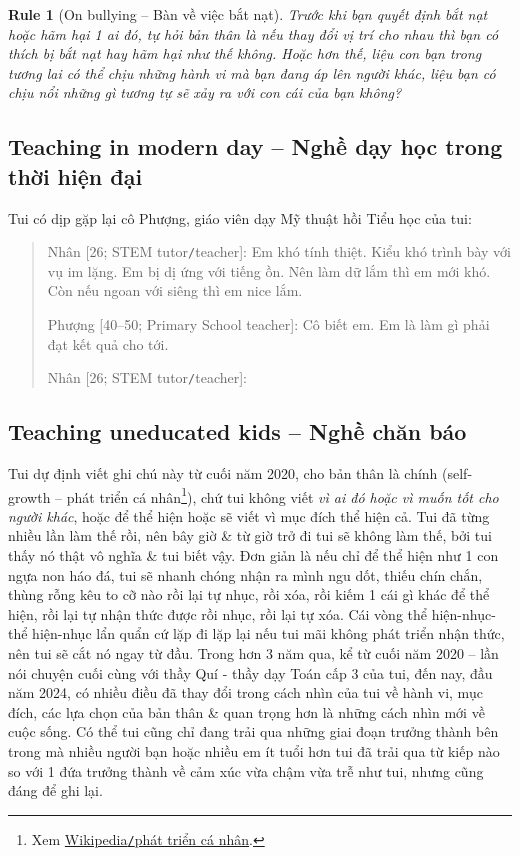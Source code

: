 \documentclass[12pt,oneside]{book}
\newtheorem{Rule}{Rule}
\begin{document}
\begin{Rule}[On bullying -- Bàn về việc bắt nạt]
	Trước khi bạn quyết định bắt nạt hoặc hãm hại 1 ai đó, tự hỏi bản thân là nếu thay đổi vị trí cho nhau thì bạn có thích bị bắt nạt hay hãm hại như thế không. Hoặc hơn thế, liệu con bạn trong tương lai có thể chịu những hành vi mà bạn đang áp lên người khác, liệu bạn có chịu nổi những gì tương tự sẽ xảy ra với con cái của bạn không?
\end{Rule}

\subsection{Teaching in modern day -- Nghề dạy học trong thời hiện đại}
Tui có dịp gặp lại cô Phượng, giáo viên dạy Mỹ thuật hồi Tiểu học của tui:

\begin{quote}
	{\sf Nhân [26; STEM tutor{\tt/}teacher]}: Em khó tính thiệt. Kiểu khó trình bày với vụ im lặng. Em bị dị ứng với tiếng ồn. Nên làm dữ lắm thì em mới khó. Còn nếu ngoan với siêng thì em nice lắm.
	
	{\sf Phượng [40--50; Primary School teacher]}: Cô biết em. Em là làm gì phải đạt kết quả cho tới.
	
	{\sf Nhân [26; STEM tutor{\tt/}teacher]}: 
\end{quote}


\subsection{Teaching uneducated kids -- Nghề chăn báo}
Tui dự định viết ghi chú này từ cuối năm 2020, cho bản thân là chính (self-growth -- phát triển cá nhân\footnote{Xem \href{https://vi.wikipedia.org/wiki/Phat_trien_ca_nhan}{Wikipedia{\tt/}phát triển cá nhân}.}), chứ tui không viết {\it vì ai đó hoặc vì muốn tốt cho người khác}, hoặc để thể hiện hoặc sẽ viết vì mục đích thể hiện cả. Tui đã từng nhiều lần làm thế rồi, nên bây giờ \& từ giờ trở đi tui sẽ không làm thế, bởi tui thấy nó thật vô nghĩa \& tui biết vậy. Đơn giản là nếu chỉ để thể hiện như 1 con ngựa non háo đá, tui sẽ nhanh chóng nhận ra mình ngu dốt, thiếu chín chắn, thùng rỗng kêu to cỡ nào rồi lại tự nhục, rồi xóa, rồi kiếm 1 cái gì khác để thể hiện, rồi lại tự nhận thức được rồi nhục, rồi lại tự xóa. Cái vòng thể hiện-nhục-thể hiện-nhục lẩn quẩn cứ lặp đi lặp lại nếu tui mãi không phát triển nhận thức, nên tui sẽ cắt nó ngay từ đầu. Trong hơn 3 năm qua, kể từ cuối năm 2020 -- lần nói chuyện cuối cùng với thầy Quí - thầy dạy Toán cấp 3 của tui, đến nay, đầu năm 2024, có nhiều điều đã thay đổi trong cách nhìn của tui về hành vi, mục đích, các lựa chọn của bản thân \& quan trọng hơn là những cách nhìn mới về cuộc sống. Có thể tui cũng chỉ đang trải qua những giai đoạn trưởng thành bên trong mà nhiều người bạn hoặc nhiều em ít tuổi hơn tui đã trải qua từ kiếp nào so với 1 đứa trưởng thành về cảm xúc vừa chậm vừa trễ như tui, nhưng cũng đáng để ghi lại.
\end{document}

